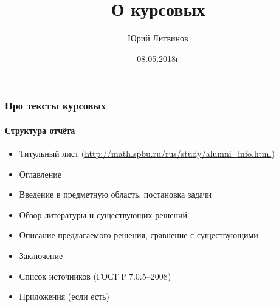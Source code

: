 \documentclass[xetex,mathserif,serif]{beamer}
\title{О курсовых}
\author{Юрий Литвинов}
\date{08.05.2018г}
\begin{document}
	\frame{\titlepage}

	\begin{frame}
		\frametitle{Про тексты курсовых}
		\framesubtitle{Структура отчёта}
		\begin{itemize}
			\item Титульный лист (\url{http://math.spbu.ru/rus/study/alumni\_info.html})
			\item Оглавление
			\item Введение в предметную область, постановка задачи
			\item Обзор литературы и существующих решений
			\item Описание предлагаемого решения, сравнение с существующими
			\item Заключение
			\item Список источников (ГОСТ Р 7.0.5--2008)
			\item Приложения (если есть)
		\end{itemize}
	\end{frame}
\end{document}
